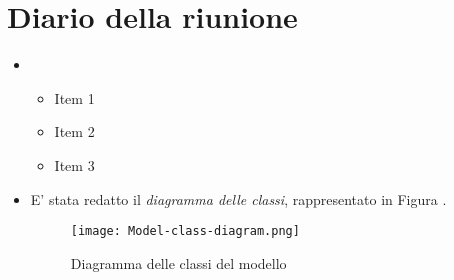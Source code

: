 \section{Diario della riunione}

\begin{itemize}
    \item \lipsum[1]
    \begin{itemize}
        \renewcommand{\labelitemii}{--}
        \item Item 1
        \item Item 2
        \item Item 3
    \end{itemize}
    \item E' stata redatto il \emph{diagramma delle classi}, rappresentato in Figura .
    \begin{figure}[h]
      \centering
      \texttt{[image: Model-class-diagram.png]}
      \caption{Diagramma delle classi del modello}
      \label{fig:immagine}
    \end{figure}
\end{itemize}